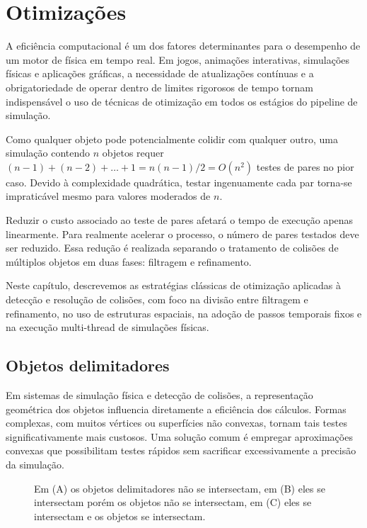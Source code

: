 \chapter{Otimizações}

A eficiência computacional é um dos fatores determinantes para o desempenho de um motor de física em tempo real. Em jogos, animações interativas, simulações físicas e aplicações gráficas, a necessidade de atualizações contínuas e a obrigatoriedade de operar dentro de limites rigorosos de tempo tornam indispensável o uso de técnicas de otimização em todos os estágios do pipeline de simulação.

Como qualquer objeto pode potencialmente colidir com qualquer outro, uma simulação contendo $n$ objetos requer $(n-1)+(n-2)+\dots+1 = n(n-1)/2 = O(n^2)$ testes de pares no pior caso. Devido à complexidade quadrática, testar ingenuamente cada par torna-se impraticável mesmo para valores moderados de $n$.

Reduzir o custo associado ao teste de pares afetará o tempo de execução apenas linearmente. Para realmente acelerar o processo, o número de pares testados deve ser reduzido. Essa redução é realizada separando o tratamento de colisões de múltiplos objetos em duas fases: filtragem e refinamento.

Neste capítulo, descrevemos as estratégias clássicas de otimização aplicadas à detecção e resolução de colisões, com foco na divisão entre filtragem e refinamento, no uso de estruturas espaciais, na adoção de passos temporais fixos e na execução multi-thread de simulações físicas.

\section{Objetos delimitadores}

Em sistemas de simulação física e detecção de colisões, a representação geométrica dos objetos influencia diretamente a eficiência dos cálculos. Formas complexas, com muitos vértices ou superfícies não convexas, tornam tais testes significativamente mais custosos. Uma solução comum é empregar aproximações convexas que possibilitam testes rápidos sem sacrificar excessivamente a precisão da simulação.

\begin{figure}[htb]
	\centering
	
	\caption{Em (A) os objetos delimitadores não se intersectam, em (B) eles se intersectam porém os objetos não se intersectam, em (C) eles se intersectam e os objetos se intersectam.}
	\label{fig:fecho-convexo-interseccao}
\end{figure}

